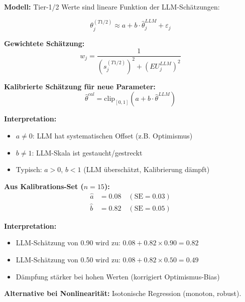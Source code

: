\begin{tcolorbox}[colback=gray!5!white, colframe=gray!75!black,
    title=\textbf{Axiom CAL-2: Lineare Kalibrierungstransformation}]

\textbf{Modell:} Tier-1/2 Werte sind lineare Funktion der LLM-Schätzungen:

\begin{equation}
\theta_j^{(T1/2)} \approx a + b \cdot \hat{\theta}_j^{LLM} + \varepsilon_j
\end{equation}

\textbf{Gewichtete Schätzung:}
\begin{equation}
\boxed{w_j = \frac{1}{(s_j^{(T1/2)})^2 + (EU_j^{LLM})^2}}
\end{equation}

\textbf{Kalibrierte Schätzung für neue Parameter:}
\begin{equation}
\boxed{\hat{\theta}^{cal} = \text{clip}_{[0,1]}(a + b \cdot \hat{\theta}^{LLM})}
\end{equation}

\textbf{Interpretation:}
\begin{itemize}[nosep]
    \item $a \neq 0$: LLM hat systematischen Offset (z.B. Optimismus)
    \item $b \neq 1$: LLM-Skala ist gestaucht/gestreckt
    \item Typisch: $a > 0$, $b < 1$ (LLM überschätzt, Kalibrierung dämpft)
\end{itemize}

\end{tcolorbox}

\begin{tcolorbox}[colback=yellow!5!white, colframe=yellow!75!black,
    title=\textbf{Beispiel: Kalibrierungs-Fit}]

\textbf{Aus Kalibrations-Set ($n = 15$):}
\begin{align*}
\hat{a} &= 0.08 \quad (\text{SE} = 0.03) \\
\hat{b} &= 0.82 \quad (\text{SE} = 0.05)
\end{align*}

\textbf{Interpretation:}
\begin{itemize}[nosep]
    \item LLM-Schätzung von 0.90 wird zu: $0.08 + 0.82 \times 0.90 = 0.82$
    \item LLM-Schätzung von 0.50 wird zu: $0.08 + 0.82 \times 0.50 = 0.49$
    \item Dämpfung stärker bei hohen Werten (korrigiert Optimismus-Bias)
\end{itemize}

\textbf{Alternative bei Nonlinearität:} Isotonische Regression (monoton, robust).

\end{tcolorbox}


